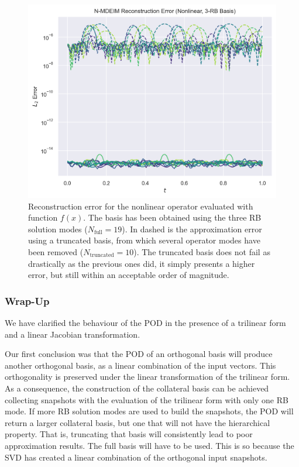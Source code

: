 \documentclass[../../thesis.tex]{subfiles}
\begin{document}
\begin{figure}[h]
    \includegraphics[width=\columnwidth]{research_project/piston/figures/svd_fourier/trilinear_nonlinear/rb_basis_mdeim_errors_nonlinear_num_3.png}
    \caption{Reconstruction error for the nonlinear operator evaluated with function $f(x)$.
    The basis has been obtained using the three RB solution modes ($N_{\text{full}}=19$).
    In dashed is the approximation error using a truncated basis, 
    from which several operator modes have been removed ($N_{\text{truncated}}=10$). 
    The truncated basis does not fail as drastically as the previous ones did, it simply presents a higher error,
    but still within an acceptable order of magnitude.}
    \label{fig:appendix_rb_nonlinear_num_3}
\end{figure}

\newpage
\subsubsection{Wrap-Up}
We have clarified the behaviour of the POD in the presence of a trilinear form 
and a linear Jacobian transformation.

Our first conclusion was that the POD of an orthogonal basis will produce
another orthogonal basis, as a linear combination of the input vectors.
This orthogonality is preserved under the linear transformation of the trilinear form.
As a consequence, the construction of the collateral basis can be achieved 
collecting snapshots with the evaluation of the trilinear form with 
only one RB mode.
If more RB solution modes are used to build the snapshots, 
the POD will return a larger collateral basis,
but one that will not have the hierarchical property.
That is, truncating that basis will consistently lead to poor approximation results.
The full basis will have to be used.
This is so because the SVD has created a linear combination of the orthogonal input snapshots.
\end{document}
